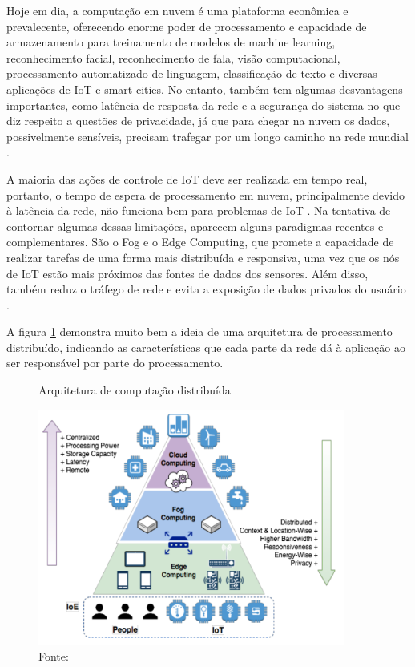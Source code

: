 Hoje em dia, a computação em nuvem é uma plataforma econômica e prevalecente, oferecendo enorme poder de processamento e capacidade de armazenamento para treinamento de modelos de machine learning, reconhecimento facial, reconhecimento de fala, visão computacional, processamento automatizado de linguagem, classificação de texto e diversas aplicações de IoT e smart cities. No entanto, também tem algumas desvantagens importantes, como latência de resposta da rede e a segurança do sistema no que diz respeito a questões de privacidade, já que para chegar na nuvem os dados, possivelmente sensíveis, precisam trafegar por um longo caminho na rede mundial \cite{Pacheco2018}.

A maioria das ações de controle de IoT deve ser realizada em tempo real, portanto, o tempo de espera de processamento em nuvem, principalmente devido à latência da rede, não funciona bem para problemas de IoT \cite{Singh2017}. Na tentativa de contornar algumas dessas limitações, aparecem alguns paradigmas recentes e complementares. São o Fog e o Edge Computing, que promete a capacidade de realizar tarefas de uma forma mais distribuída e responsiva, uma vez que os nós de IoT estão mais próximos das fontes de dados dos sensores. Além disso, também reduz o tráfego de rede e evita a exposição de dados privados do usuário \cite{Pacheco2018}.

A figura \ref{fig:arquitetura} demonstra muito bem a ideia de uma arquitetura de processamento distribuído, indicando as características que cada parte da rede dá à aplicação ao ser responsável por parte do processamento.
\begin{figure}[H]
    \centering
    \caption[Arquitetura de computação distribuída]{Arquitetura de computação distribuída}
    \includegraphics[width=0.9\textwidth]{Cap2_Revisao_Teorica/Figures/arquitetura_distribuida.png}
    \caption*{Fonte: \cite{Pacheco2018}}
    \label{fig:arquitetura}
\end{figure}

